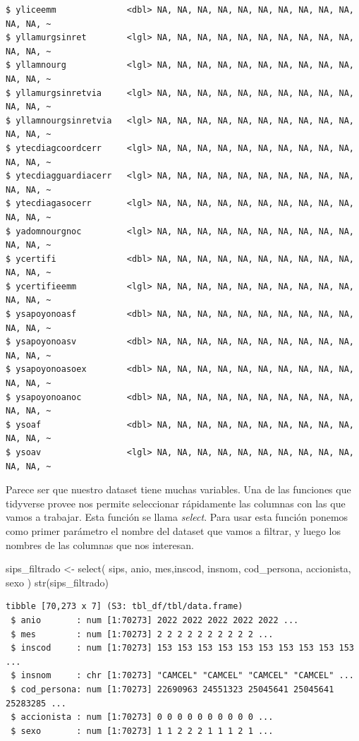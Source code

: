 \documentclass[
  letterpaper,
  DIV=11,
  numbers=noendperiod]{scrreprt}
\newenvironment{Shaded}{\begin{snugshade}}{\end{snugshade}}
\newcommand{\FunctionTok}[1]{\textcolor[rgb]{0.28,0.35,0.67}{#1}}
\newcommand{\NormalTok}[1]{\textcolor[rgb]{0.00,0.23,0.31}{#1}}
\newcommand{\OtherTok}[1]{\textcolor[rgb]{0.00,0.23,0.31}{#1}}
\begin{document}
\begin{verbatim}
$ yliceemm              <dbl> NA, NA, NA, NA, NA, NA, NA, NA, NA, NA, NA, NA, ~
$ yllamurgsinret        <lgl> NA, NA, NA, NA, NA, NA, NA, NA, NA, NA, NA, NA, ~
$ yllamnourg            <lgl> NA, NA, NA, NA, NA, NA, NA, NA, NA, NA, NA, NA, ~
$ yllamurgsinretvia     <lgl> NA, NA, NA, NA, NA, NA, NA, NA, NA, NA, NA, NA, ~
$ yllamnourgsinretvia   <lgl> NA, NA, NA, NA, NA, NA, NA, NA, NA, NA, NA, NA, ~
$ ytecdiagcoordcerr     <lgl> NA, NA, NA, NA, NA, NA, NA, NA, NA, NA, NA, NA, ~
$ ytecdiagguardiacerr   <lgl> NA, NA, NA, NA, NA, NA, NA, NA, NA, NA, NA, NA, ~
$ ytecdiagasocerr       <lgl> NA, NA, NA, NA, NA, NA, NA, NA, NA, NA, NA, NA, ~
$ yadomnourgnoc         <lgl> NA, NA, NA, NA, NA, NA, NA, NA, NA, NA, NA, NA, ~
$ ycertifi              <dbl> NA, NA, NA, NA, NA, NA, NA, NA, NA, NA, NA, NA, ~
$ ycertifieemm          <lgl> NA, NA, NA, NA, NA, NA, NA, NA, NA, NA, NA, NA, ~
$ ysapoyonoasf          <dbl> NA, NA, NA, NA, NA, NA, NA, NA, NA, NA, NA, NA, ~
$ ysapoyonoasv          <dbl> NA, NA, NA, NA, NA, NA, NA, NA, NA, NA, NA, NA, ~
$ ysapoyonoasoex        <dbl> NA, NA, NA, NA, NA, NA, NA, NA, NA, NA, NA, NA, ~
$ ysapoyonoanoc         <dbl> NA, NA, NA, NA, NA, NA, NA, NA, NA, NA, NA, NA, ~
$ ysoaf                 <dbl> NA, NA, NA, NA, NA, NA, NA, NA, NA, NA, NA, NA, ~
$ ysoav                 <lgl> NA, NA, NA, NA, NA, NA, NA, NA, NA, NA, NA, NA, ~
\end{verbatim}

Parece ser que nuestro dataset tiene muchas variables. Una de las
funciones que tidyverse provee nos permite seleccionar rápidamente las
columnas con las que vamos a trabajar. Esta función se llama
\emph{select}. Para usar esta función ponemos como primer parámetro el
nombre del dataset que vamos a filtrar, y luego los nombres de las
columnas que nos interesan.

\begin{Shaded}
\begin{Highlighting}[]
\NormalTok{sips\_filtrado }\OtherTok{\textless{}{-}} \FunctionTok{select}\NormalTok{(}
\NormalTok{  sips, anio, mes,inscod, insnom, cod\_persona, accionista, sexo}
\NormalTok{)}
\FunctionTok{str}\NormalTok{(sips\_filtrado)}
\end{Highlighting}
\end{Shaded}

\begin{verbatim}
tibble [70,273 x 7] (S3: tbl_df/tbl/data.frame)
 $ anio       : num [1:70273] 2022 2022 2022 2022 2022 ...
 $ mes        : num [1:70273] 2 2 2 2 2 2 2 2 2 2 ...
 $ inscod     : num [1:70273] 153 153 153 153 153 153 153 153 153 153 ...
 $ insnom     : chr [1:70273] "CAMCEL" "CAMCEL" "CAMCEL" "CAMCEL" ...
 $ cod_persona: num [1:70273] 22690963 24551323 25045641 25045641 25283285 ...
 $ accionista : num [1:70273] 0 0 0 0 0 0 0 0 0 0 ...
 $ sexo       : num [1:70273] 1 1 2 2 2 1 1 1 2 1 ...
\end{verbatim}
\end{document}
